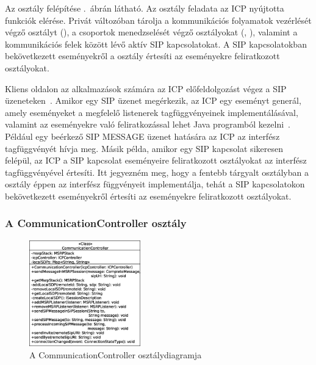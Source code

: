 Az  osztály felépítése .~ábrán látható. Az osztály feladata az ICP nyújtotta funkciók elérése. Privát változóban tárolja a kommunikációs folyamatok vezérlését végző osztályt (), a csoportok menedzselését végző osztályokat (, ), valamint a kommunikációs felek között lévő aktív SIP kapcsolatokat. A SIP kapcsolatokban bekövetkezett eseményekről a  osztály értesíti az eseményekre feliratkozott osztályokat.

\begin{mycomment}
Kliens oldalon az alkalmazások számára az ICP előfeldolgozást végez a SIP üzeneteken~\cite{sds_dev_guide}. Amikor egy SIP üzenet megérkezik, az ICP egy eseményt generál, amely eseményeket a megfelelő listenerek tagfüggvényeinek implementálásával, valamint az eseményekre való feliratkozással lehet Java programból kezelni~\cite{sds_client_flow}. Például egy beérkező SIP MESSAGE üzenet hatására az ICP az  interfész  tagfüggvényét hívja meg. Másik példa, amikor egy SIP kapcsolat sikeresen felépül, az ICP a SIP kapcsolat eseményeire feliratkozott osztályokat az  interfész  tagfüggvényével értesíti. Itt jegyezném meg, hogy a fentebb tárgyalt  osztályban a  osztály éppen az  interfész függvényeit implementálja, tehát a SIP kapcsolatokon bekövetkezett eseményekről értesíti az eseményekre feliratkozott osztályokat.
\end{mycomment}

\subsubsection*{A CommunicationController osztály}
\label{sec:client_communication_controller}

\begin{figure}
  \vspace{-68pt}
  \begin{center}
    \includegraphics[width=0.43\textwidth]{img/class_diagrams/client/eps/CommunicationController.eps}
  \end{center}
  \vspace{-15pt}
  \captionsetup{font=scriptsize}
  \caption{A CommunicationController osztálydiagramja}
   \label{fig:class_client_communication_controller}
  \vspace{-18pt}
\end{figure}

